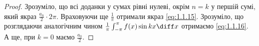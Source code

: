 \begin{proof}
    Зрозуміло, що всі доданки у сумах рівні нулеві, окрім $n = k$ у першій сумі, який якраз $\frac{a_n}{2} \cdot 2 \pi$. Враховуючи ще $\frac{1}{\pi}$  отримали якраз \eqref{eq:1.1.15}. Зрозуміло, що розглядаючи аналогічним чином $\frac{1}{\pi} \int_{-\pi}^\pi f(x) \sin k x \diff x$ отримаємо \eqref{eq:1.1.16}. А ще, при $k = 0$ маємо $\frac{a_0}{2}$.
\end{proof}
